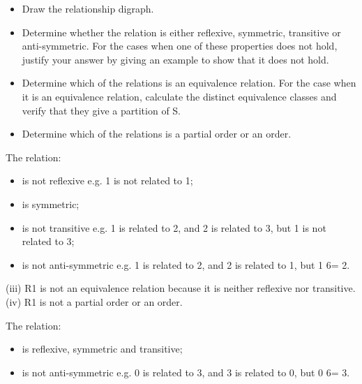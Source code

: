 \documentclass[]{report}
\begin{document}
\begin{itemize}

\item Draw the relationship digraph.
\item  Determine whether the relation is either reflexive, symmetric, transitive
or anti-symmetric. For the cases when one of these properties
does not hold, justify your answer by giving an example to show that
it does not hold.

\item  Determine which of the relations is an equivalence relation. For the
case when it is an equivalence relation, calculate the distinct equivalence
classes and verify that they give a partition of S.
\item Determine which of the relations is a partial order or an order.
\end{itemize}
The relation:
\begin{itemize}
\item is not reflexive e.g. 1 is not related to 1;
\item is symmetric;
\item is not transitive e.g. 1 is related to 2, and 2 is related to 3, but 1 is not related to 3;
\item is not anti-symmetric e.g. 1 is related to 2, and 2 is related to 1,
but 1 6= 2.
\end{itemize}



	
(iii) R1 is not an equivalence relation because it is neither reflexive
nor transitive.
(iv) R1 is not a partial order or an order.


	
The relation:
\begin{itemize}
    \item is reflexive, symmetric and transitive;
\item is not anti-symmetric e.g. 0 is related to 3, and 3 is related to 0,
but 0 6= 3.
\end{itemize}


\end{document}

